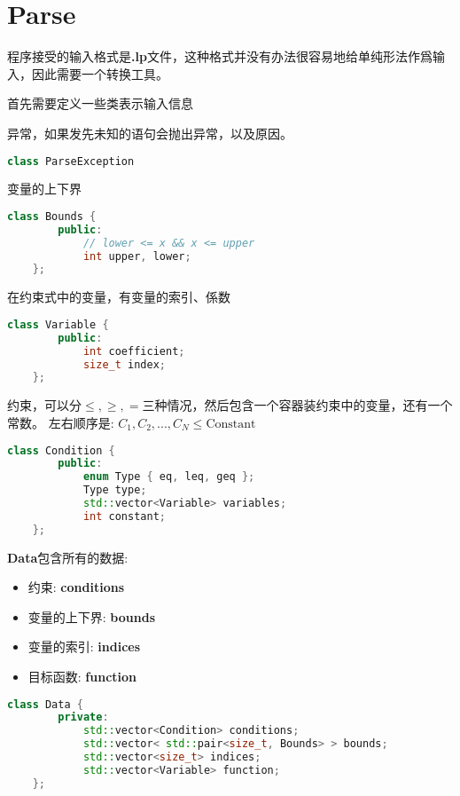 \section{Parse}
程序接受的输入格式是\textbf{.lp}文件，这种格式并没有办法很容易地给单纯形法作爲输入，因此需要一个转换工具。

首先需要定义一些类表示输入信息

异常，如果发先未知的语句会抛出异常，以及原因。


\begin{lstlisting}[language=C++]
    class ParseException
\end{lstlisting}

变量的上下界

\begin{lstlisting}[language=C++]
    class Bounds {
        public:
            // lower <= x && x <= upper
            int upper, lower;
    };
\end{lstlisting}

在约束式中的变量，有变量的索引、係数

\begin{lstlisting}[language=C++]
    class Variable {
        public:
            int coefficient;
            size_t index;
    };
\end{lstlisting}


约束，可以分$\leq, \geq, =$三种情况，然后包含一个容器装约束中的变量，还有一个常数。
左右顺序是: $C_1, C_2, ..., C_N \leq \text{Constant}$

\begin{lstlisting}[language=C++]
    class Condition {
        public:
            enum Type { eq, leq, geq };
            Type type;
            std::vector<Variable> variables;
            int constant;
    };
\end{lstlisting}


\textbf{Data}包含所有的数据:
\begin{itemize}
    \item 约束: \textbf{conditions}
    \item 变量的上下界: \textbf{bounds}
    \item 变量的索引: \textbf{indices}
    \item 目标函数: \textbf{function}
\end{itemize}

\begin{lstlisting}[language=C++]
    class Data {
        private:
            std::vector<Condition> conditions;
            std::vector< std::pair<size_t, Bounds> > bounds;
            std::vector<size_t> indices;
            std::vector<Variable> function;
    };
\end{lstlisting}


